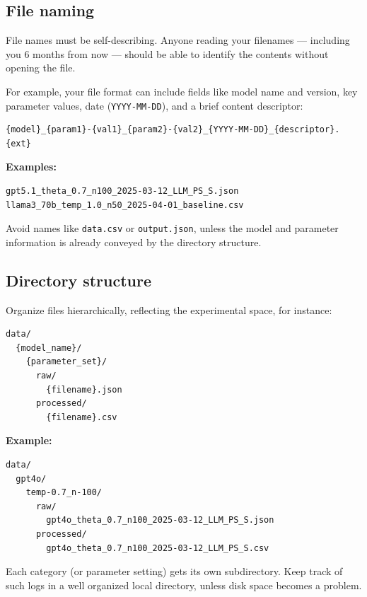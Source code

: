 \documentclass[11pt, letterpaper]{article}
\begin{document}
\subsection{File naming}

File names must be self-describing. Anyone reading your filenames --- including you 6 months from now --- should be able to identify the contents without opening the file.

For example, your file format can include fields like model name and version, key parameter values, date (\texttt{YYYY-MM-DD}), and a brief content descriptor:

\begin{lstlisting}
{model}_{param1}-{val1}_{param2}-{val2}_{YYYY-MM-DD}_{descriptor}.{ext}
\end{lstlisting}

\textbf{Examples:}
\begin{lstlisting}
gpt5.1_theta_0.7_n100_2025-03-12_LLM_PS_S.json
llama3_70b_temp_1.0_n50_2025-04-01_baseline.csv
\end{lstlisting}

Avoid names like \texttt{data.csv} or \texttt{output.json}, unless the model and parameter information is already conveyed by the directory structure.

\subsection{Directory structure}

Organize files hierarchically, reflecting the experimental space, for instance:

\begin{lstlisting}
data/
  {model_name}/
    {parameter_set}/
      raw/
        {filename}.json
      processed/
        {filename}.csv
\end{lstlisting}

\textbf{Example:}
\begin{lstlisting}
data/
  gpt4o/
    temp-0.7_n-100/
      raw/
        gpt4o_theta_0.7_n100_2025-03-12_LLM_PS_S.json
      processed/
        gpt4o_theta_0.7_n100_2025-03-12_LLM_PS_S.csv
\end{lstlisting}

Each category (or parameter setting) gets its own subdirectory. 
Keep track of such logs in a well organized local directory, unless disk space becomes a problem. 
\end{document}
